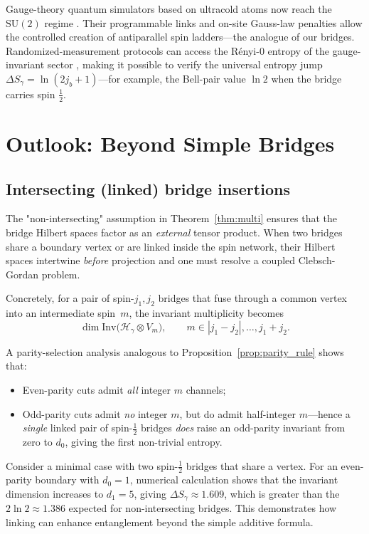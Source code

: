 \documentclass[11pt, a4paper]{article}
\theoremstyle{plain}
\theoremstyle{definition}
\theoremstyle{remark}
\newcommand{\Hil}{\mathcal{H}}
\newcommand{\Inv}{\mathrm{Inv}}
\newcommand{\SU}{\mathrm{SU}}
\begin{document}
Gauge-theory quantum simulators based on ultracold atoms now reach the $\SU(2)$ regime \cite{Zohar2023GaugeSim}. Their programmable links and on-site Gauss-law penalties allow the controlled creation of antiparallel spin ladders—the analogue of our bridges. Randomized-measurement protocols can access the R\'enyi-0 entropy of the gauge-invariant sector \cite{Dreyer2022GaugeRenyi}, making it possible to verify the universal entropy jump $\Delta S_{\gamma} = \ln(2j_b+1)$---for example, the Bell-pair value $\ln 2$ when the bridge carries spin $\frac{1}{2}$.

\section{Outlook: Beyond Simple Bridges}
\label{sec:outlook}

\subsection{Intersecting (linked) bridge insertions}
\label{sec:intersecting}

The "non-intersecting" assumption in Theorem~\ref{thm:multi} ensures that the bridge Hilbert spaces factor as an \emph{external} tensor product. When two bridges share a boundary vertex or are linked inside the spin network, their Hilbert spaces intertwine \emph{before} projection and one must resolve a coupled Clebsch-Gordan problem.

Concretely, for a pair of spin-$j_{1},j_{2}$ bridges that fuse through a common vertex into an intermediate spin~$m$, the invariant multiplicity becomes
\[  \dim \Inv\!\bigl(\Hil_{\gamma}\otimes V_{m}\bigr),  \qquad  m\in |j_{1}-j_{2}|,\dots,j_{1}+j_{2}.\]

A parity-selection analysis analogous to Proposition~\ref{prop:parity_rule} shows that:
\begin{itemize}\setlength\itemsep{4pt}
\item Even-parity cuts admit \emph{all} integer $m$ channels;
\item Odd-parity cuts admit \emph{no} integer $m$, but do admit half-integer $m$—hence a \emph{single} linked pair of spin-$\frac{1}{2}$ bridges \emph{does} raise an odd-parity invariant from zero to $d_{0}$, giving the first non-trivial entropy.
\end{itemize}

\begin{example}
Consider a minimal case with two spin-$\frac{1}{2}$ bridges that share a vertex. For an even-parity boundary with $d_0=1$, numerical calculation shows that the invariant dimension increases to $d_1=5$, giving $\Delta S_{\gamma} \approx 1.609$, which is greater than the $2\ln 2 \approx 1.386$ expected for non-intersecting bridges. This demonstrates how linking can enhance entanglement beyond the simple additive formula.
\end{example}
\end{document}

